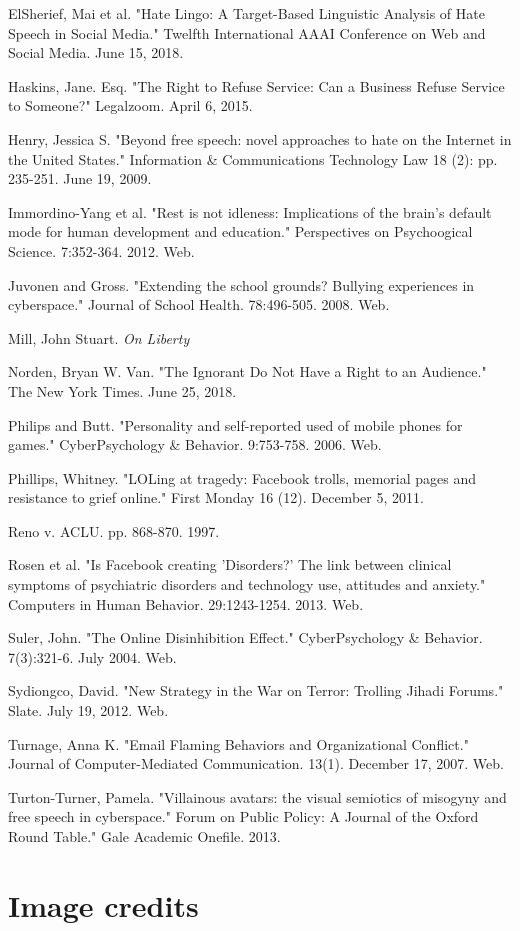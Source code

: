\documentclass[class=book, crop=false]{standalone}
\begin{document}
ElSherief, Mai et al. "Hate Lingo: A Target-Based Linguistic Analysis of Hate Speech in Social Media." Twelfth International AAAI Conference on Web and Social Media. June 15, 2018.

Haskins, Jane. Esq. "The Right to Refuse Service: Can a Business Refuse Service to Someone?" Legalzoom. April 6, 2015.

Henry, Jessica S. "Beyond free speech: novel approaches to hate on the Internet in the United States." Information \& Communications Technology Law 18 (2): pp. 235-251. June 19, 2009.

Immordino-Yang et al. "Rest is not idleness: Implications of the brain's default mode for human development and education." Perspectives on Psychoogical Science. 7:352-364. 2012. Web.

Juvonen and Gross. "Extending the school grounds? Bullying experiences in cyberspace." Journal of School Health. 78:496-505. 2008. Web.

Mill, John Stuart. \textit{On Liberty}

Norden, Bryan W. Van. "The Ignorant Do Not Have a Right to an Audience." The New York Times. June 25, 2018.

Philips and Butt. "Personality and self-reported used of mobile phones for games." CyberPsychology \& Behavior. 9:753-758. 2006. Web.

Phillips, Whitney. "LOLing at tragedy: Facebook trolls, memorial pages and resistance to grief online." First Monday 16 (12). December 5, 2011.

Reno v. ACLU. pp. 868-870. 1997.

Rosen et al. "Is Facebook creating 'Disorders?' The link between clinical symptoms of psychiatric disorders and technology use, attitudes and anxiety." Computers in Human Behavior. 29:1243-1254. 2013. Web.

Suler, John. "The Online Disinhibition Effect." CyberPsychology \& Behavior. 7(3):321-6. July 2004. Web.

Sydiongco, David. "New Strategy in the War on Terror: Trolling Jihadi Forums." Slate. July 19, 2012. Web.

Turnage, Anna K. "Email Flaming Behaviors and Organizational Conflict." Journal of Computer-Mediated Communication. 13(1). December 17, 2007. Web.

Turton-Turner, Pamela. "Villainous avatars: the visual semiotics of misogyny and free speech in cyberspace." Forum on Public Policy: A Journal of the Oxford Round Table." Gale Academic Onefile. 2013.

\section{Image credits}
\end{document}
